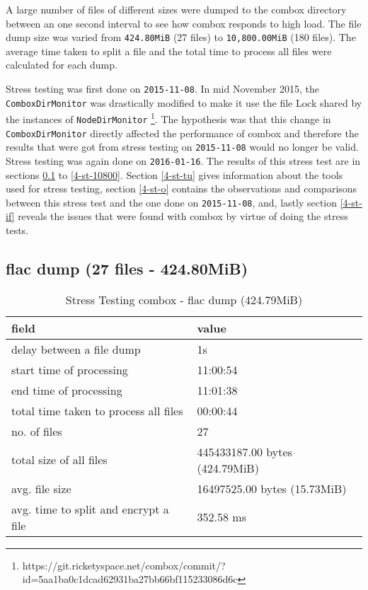 A large number of files of different sizes were dumped to the combox
directory between an one second interval to see how combox responds to
high load. The file dump size was varied from \verb+424.80MiB+ (27
files) to \verb+10,800.00MiB+ (180 files). The average time taken to
split a file and the total time to process all files were calculated
for each dump.

Stress testing was first done on \verb+2015-11-08+. In mid November
2015, the \\ \verb+ComboxDirMonitor+ was drastically modified to make
it use the file Lock shared by the instances of \verb+NodeDirMonitor+
\footnote{https://git.ricketyspace.net/combox/commit/?id=5aa1ba0c1dcad62931ba27bb66bf115233086d6c}.
The hypothesis was that this change in \verb+ComboxDirMonitor+
directly affected the performance of combox and therefore the results
that were got from stress testing on \verb+2015-11-08+ would no longer
be valid. Stress testing was again done on \verb+2016-01-16+. The
results of this stress test are in sections \ref{4-st-424} to
\ref{4-st-10800}. Section \ref{4-st-tu} gives information about the
tools used for stress testing, section \ref{4-st-o} contains the
observations and comparisons between this stress test and the one done
on \verb+2015-11-08+, and, lastly section \ref{4-st-if} reveals the
issues that were found with combox by virtue of doing the stress
tests.

\subsection{flac dump (27 files - 424.80MiB)}\label{4-st-424}

\begin{center}
  \begin{table}[h]
    \begin{tabular}{ll}
      field & value\\
      \hline
      delay between a file dump & 1s\\
      start time of processing & 11:00:54\\
      end time of processing & 11:01:38\\
      total time taken to process all files & 00:00:44\\
      no. of files & 27\\
      total size of all files & 445433187.00 bytes (424.79MiB)\\
      avg. file size & 16497525.00 bytes (15.73MiB)\\
      avg. time to split and encrypt a file & 352.58 ms\\
    \end{tabular}
    \caption{Stress Testing combox - flac dump (424.79MiB)}
  \end{table}
\end{center}


